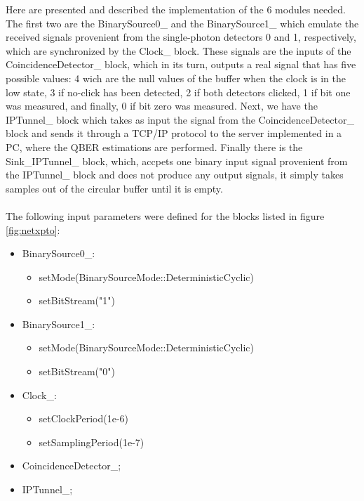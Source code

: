 \begin{refsection}
Here are presented and described the implementation of the 6 modules needed. The first two are the BinarySource0\_ and the BinarySource1\_ which emulate the received signals provenient from the single-photon detectors 0 and 1, respectively, which are synchronized by the Clock\_ block. These signals are the inputs of the CoincidenceDetector\_ block, which in its turn, outputs a real signal that has five possible values: 4 wich are the null values of the buffer when the clock is in the low state, 3 if no-click has been detected, 2 if both detectors clicked, 1 if bit one was measured, and finally, 0 if bit zero was measured. Next, we have the IPTunnel\_ block which takes as input the signal from the CoincidenceDetector\_ block and sends it through a TCP/IP protocol to the server implemented in a PC, where the QBER estimations are performed. Finally there is the Sink\_IPTunnel\_ block, which, accpets one binary input signal provenient from the IPTunnel\_ block and does not produce any output signals, it simply takes samples out of the circular buffer until it is empty.\\ \\

The following input parameters were defined for the blocks listed in figure \ref{fig:netxpto}:

\begin{itemize}
	\item BinarySource0\_:
	\begin{itemize}
		\item setMode(BinarySourceMode::DeterministicCyclic)
		\item setBitStream("1")
	\end{itemize}
	\clearpage
	\item BinarySource1\_:
	\begin{itemize}
		\item setMode(BinarySourceMode::DeterministicCyclic)
		\item setBitStream("0")
	\end{itemize}
	
	\item Clock\_:
	\begin{itemize}
		\item setClockPeriod(1e-6)
		\item setSamplingPeriod(1e-7)
	\end{itemize}
	
	\item CoincidenceDetector\_;
	
	\item IPTunnel\_;
	

\end{itemize}
\end{refsection}
